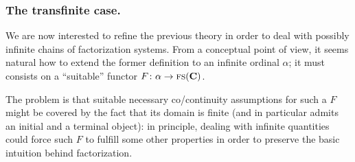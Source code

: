 \subsubsection{The transfinite case.}\label{transfinite.case} We are now interested to refine the previous theory in order to deal with possibly infinite chains of factorization systems. From a conceptual point of view, it seems natural how to extend the former definition to an infinite ordinal $\alpha$; it must consists on a ``suitable'' functor $F\colon \alpha\to \textsc{fs}(\mathbf{C})$.

The problem is that suitable necessary co\fshyp{}continuity assumptions for such a $F$ might be covered by the fact that its domain is finite (and in particular admits an initial and a terminal object): in principle, dealing with infinite quantities could force such $F$ to fulfill some other properties in order to preserve the basic intuition behind factorization.

